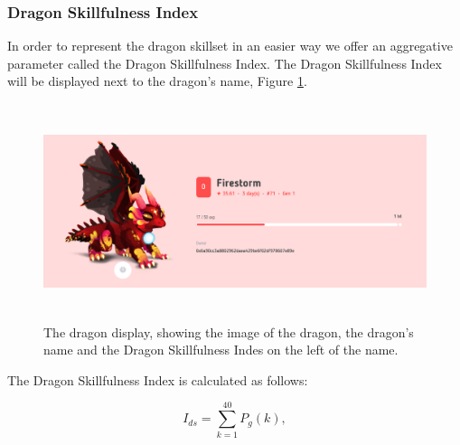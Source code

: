 \documentclass[12pt]{article}
\begin{document}
{ \subsubsection{Dragon Skillfulness Index}\label{Dragon Skillfulness Index} \par

In order to represent the dragon skillset in an easier way we offer an aggregative parameter called the Dragon Skillfulness Index. The Dragon Skillfulness Index will be displayed next to the dragon’s name, Figure \ref{fig:The_dragon_display_showing_the_image_of_the_dragon_the_dragons_name_and_the_Dragon_Skillfulness_Indes_on_the_left_of_the_name}.\par




\begin{figure}[!ht]
	\begin{FlushLeft}		\includegraphics[width=6.27in,height=2.49in]{./media/image21.png}
		\caption{The dragon display, showing the image of the dragon, the dragon's name and the Dragon Skillfulness Indes on the left of the name.}
		\label{fig:The_dragon_display_showing_the_image_of_the_dragon_the_dragons_name_and_the_Dragon_Skillfulness_Indes_on_the_left_of_the_name}
	\end{FlushLeft}\end{figure}




\par

The Dragon Skillfulness Index is calculated as follows:\par

\setlength{\parskip}{0.0pt}
\begin{center}
  \begin{equation}
      I_{ds}=\sum_{k=1}^{40} P_g(k),
  \end{equation}
\end{center} \par

}
\end{document}
